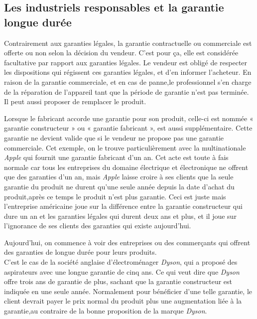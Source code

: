 \subsection{Les industriels responsables et la garantie longue durée}


\smallbreak
Contrairement aux garanties légales, la garantie contractuelle ou commerciale est offerte ou non selon la décision du vendeur. C'est pour ça, elle est considérée facultative par rapport aux garanties légales. Le vendeur est obligé de respecter les dispositions qui régissent ces garanties légales, et d'en informer l'acheteur. 
En raison de la garantie commerciale, et en cas de panne,le professionnel s’en charge de la réparation de l’appareil tant que la période de garantie n'est pas terminée. Il peut aussi proposer de remplacer le produit.


\smallbreak
Lorsque le fabricant accorde une garantie pour son produit, celle-ci est nommée « garantie constructeur » ou « garantie fabricant », est aussi supplémentaire. Cette garantie ne devient valide que si le vendeur ne propose pas une garantie commerciale.
\smallbreak
Cet exemple, on le trouve particulièrement avec la multinationale \textit{Apple} qui fournit une garantie fabricant d’un an. Cet acte est toute à fais normale car tous les entreprises du domaine électrique et électronique ne offrent que des garanties d’un an, mais \textit{Apple} laisse croire à ses clients que la seule garantie du produit ne durent qu'une seule année depuis la date d'achat du produit,après ce temps le produit n'est plus garantie. Ceci est juste mais l'entreprise américaine joue sur la différence entre la garantie constructeur qui dure un an et les garanties légales qui durent deux ans et plus, et il joue sur l'ignorance de ses clients des garanties qui existe aujourd'hui.


\smallbreak
Aujourd'hui, on commence à voir des entreprises ou des commerçants qui offrent des garanties de longue durée pour leurs produits.\\
\smallbreak C'est le cas de la société anglaise d’électroménager \textit{Dyson}, qui a proposé des aspirateurs avec une longue garantie de cinq ans. Ce qui veut dire que \textit{Dyson} offre trois ans de garantie de plus, sachant que la garantie constructeur est indiquée en une seule année. Normalement pour bénéficier d'une telle garantie, le client devrait payer le prix normal du produit plus une augmentation liée à la garantie,au contraire de la bonne proposition de la marque \textit{Dyson}.


